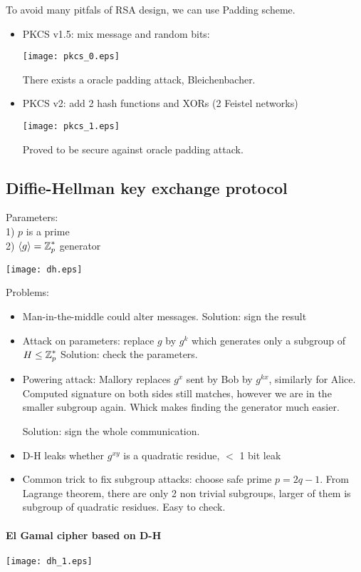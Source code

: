 To avoid many pitfals of RSA design, we can use Padding scheme.
\begin{itemize}
	\item PKCS v1.5: mix message and random bits:

		\texttt{[image: pkcs\_0.eps]}

		There exists a oracle padding attack, Bleichenbacher.
	\item PKCS v2: add 2 hash functions and XORs (2 Feistel networks)

		\texttt{[image: pkcs\_1.eps]}

		Proved to be secure against oracle padding attack.
\end{itemize}

\subsection{Diffie-Hellman key exchange protocol}
Parameters:\\
1) $p$ is a prime\\
2) $\langle g \rangle = \operatorname{\mathbb{Z}}_p^{\ast}$ generator

\texttt{[image: dh.eps]}

Problems:
\begin{itemize}
	\item Man-in-the-middle could alter messages. Solution: sign the result
	\item Attack on parameters: replace $g$ by $g^k$ which generates only a subgroup of $H \leq \operatorname{\mathbb{Z}}_p^{\ast}$
		Solution: check the parameters.
	\item Powering attack: Mallory replaces $g^x$ sent by Bob by $g^{kx}$, similarly for Alice.
		Computed signature on both sides still matches, however we are in the smaller subgroup again.
		Whick makes finding the generator much easier.

		Solution: sign the whole communication.
	\item D-H leaks whether $g^{xy}$ is a quadratic residue, $<$ 1 bit leak
	\item Common trick to fix subgroup attacks: choose safe prime $p = 2q - 1$.
		From Lagrange theorem, there are only 2 non trivial subgroups, larger of them is subgroup of quadratic residues. Easy to check.
\end{itemize}

\paragraph{El Gamal cipher based on D-H}
\texttt{[image: dh\_1.eps]}

